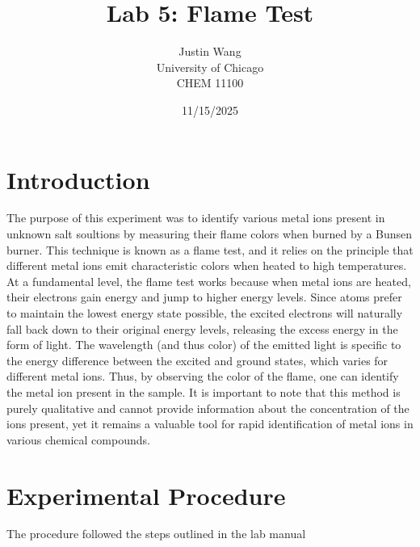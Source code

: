 \documentclass[11pt]{article}
\title{\textbf{Lab 5: Flame Test}}
\author{Justin Wang\\ University of Chicago \\ CHEM 11100}
\date{11/15/2025}
\begin{document}
\maketitle
\section*{Introduction}
\hspace{2em}The purpose of this experiment was to identify various metal ions present in unknown salt soultions by measuring their flame colors when burned by a Bunsen burner.
This technique is known as a flame test, and it relies on the principle that different metal ions emit characteristic colors when heated to high temperatures.
At a fundamental level, the flame test works because when metal ions are heated, their electrons gain energy and jump to higher energy levels.
Since atoms prefer to maintain the lowest energy state possible, the excited electrons will naturally fall back down to their original energy levels, releasing the excess energy in the form of light. The wavelength (and thus color) of the emitted light is specific to the energy difference between the excited and ground states, which varies for different metal ions.
Thus, by observing the color of the flame, one can identify the metal ion present in the sample. It is important to note that this method is purely qualitative and cannot provide information about the concentration of the ions present, yet it remains a valuable tool for rapid identification of metal ions in various chemical compounds.

\section*{Experimental Procedure}
The procedure followed the steps outlined in the lab manual
\end{document}
